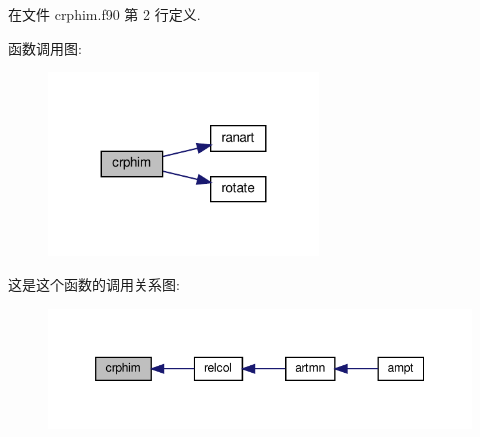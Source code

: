 在文件 crphim.\+f90 第 2 行定义.

函数调用图\+:
\nopagebreak
\begin{figure}[H]
\begin{center}
\leavevmode
\includegraphics[width=203pt]{crphim_8f90_acf594bc7111627995fad1468b3677a37_cgraph}
\end{center}
\end{figure}
这是这个函数的调用关系图\+:
\nopagebreak
\begin{figure}[H]
\begin{center}
\leavevmode
\includegraphics[width=350pt]{crphim_8f90_acf594bc7111627995fad1468b3677a37_icgraph}
\end{center}
\end{figure}
